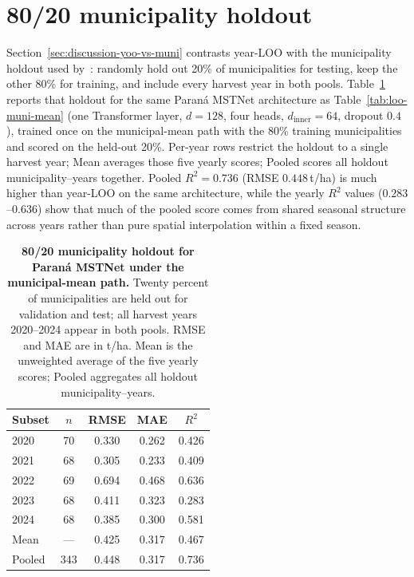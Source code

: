 \section{80/20 municipality holdout}
\label{app:muni80-20}
Section~\ref{sec:discussion-yoo-vs-muni} contrasts year-LOO with the municipality holdout used by~\citet{song2022soy}: randomly hold out 20\% of municipalities for testing, keep the other 80\% for training, and include every harvest year in both pools.
Table~\ref{tab:muni80-20} reports that holdout for the same Paran\'{a} MSTNet architecture as Table~\ref{tab:loo-muni-mean} (one Transformer layer, $d=128$, four heads, $d_{\mathrm{inner}}=64$, dropout $0.4$), trained once on the municipal-mean path with the 80\% training municipalities and scored on the held-out 20\%.
Per-year rows restrict the holdout to a single harvest year; Mean averages those five yearly scores; Pooled scores all holdout municipality--years together.
Pooled $R^2=0.736$ (RMSE $0.448$\,\si{t/ha}) is much higher than year-LOO on the same architecture, while the yearly $R^2$ values ($0.283$--$0.636$) show that much of the pooled score comes from shared seasonal structure across years rather than pure spatial interpolation within a fixed season.

\begin{table}[!htbp]
\centering
\caption{\textbf{80/20 municipality holdout for Paran\'{a} MSTNet under the municipal-mean path.}
Twenty percent of municipalities are held out for validation and test; all harvest years 2020--2024 appear in both pools.
RMSE and MAE are in \si{t/ha}.
Mean is the unweighted average of the five yearly scores; Pooled aggregates all holdout municipality--years.}
\label{tab:muni80-20}
\begin{tabular}{lcccc}
\toprule
Subset & $n$ & RMSE & MAE & $R^2$ \\
\midrule
2020 & 70 & 0.330 & 0.262 & 0.426 \\
2021 & 68 & 0.305 & 0.233 & 0.409 \\
2022 & 69 & 0.694 & 0.468 & 0.636 \\
2023 & 68 & 0.411 & 0.323 & 0.283 \\
2024 & 68 & 0.385 & 0.300 & 0.581 \\
\midrule
Mean & --- & 0.425 & 0.317 & 0.467 \\
Pooled & 343 & 0.448 & 0.317 & 0.736 \\
\bottomrule
\end{tabular}
\end{table}

